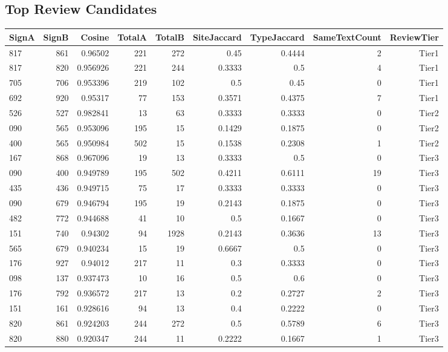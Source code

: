 ﻿\documentclass[11pt,a4paper]{article}
\begin{document}
\subsection*{Top Review Candidates}
\begin{center}
\begin{tabular}{lrrrrrrrr}
\toprule
\textbf{SignA} & \textbf{SignB} & \textbf{Cosine} & \textbf{TotalA} & \textbf{TotalB} & \textbf{SiteJaccard} & \textbf{TypeJaccard} & \textbf{SameTextCount} & \textbf{ReviewTier} \\
\midrule
817 & 861 & 0.96502 & 221 & 272 & 0.45 & 0.4444 & 2 & Tier1 \\
817 & 820 & 0.956926 & 221 & 244 & 0.3333 & 0.5 & 4 & Tier1 \\
705 & 706 & 0.953396 & 219 & 102 & 0.5 & 0.45 & 0 & Tier1 \\
692 & 920 & 0.95317 & 77 & 153 & 0.3571 & 0.4375 & 7 & Tier1 \\
526 & 527 & 0.982841 & 13 & 63 & 0.3333 & 0.3333 & 0 & Tier2 \\
090 & 565 & 0.953096 & 195 & 15 & 0.1429 & 0.1875 & 0 & Tier2 \\
400 & 565 & 0.950984 & 502 & 15 & 0.1538 & 0.2308 & 1 & Tier2 \\
167 & 868 & 0.967096 & 19 & 13 & 0.3333 & 0.5 & 0 & Tier3 \\
090 & 400 & 0.949789 & 195 & 502 & 0.4211 & 0.6111 & 19 & Tier3 \\
435 & 436 & 0.949715 & 75 & 17 & 0.3333 & 0.3333 & 0 & Tier3 \\
090 & 679 & 0.946794 & 195 & 19 & 0.2143 & 0.1875 & 0 & Tier3 \\
482 & 772 & 0.944688 & 41 & 10 & 0.5 & 0.1667 & 0 & Tier3 \\
151 & 740 & 0.94302 & 94 & 1928 & 0.2143 & 0.3636 & 13 & Tier3 \\
565 & 679 & 0.940234 & 15 & 19 & 0.6667 & 0.5 & 0 & Tier3 \\
176 & 927 & 0.94012 & 217 & 11 & 0.3 & 0.3333 & 0 & Tier3 \\
098 & 137 & 0.937473 & 10 & 16 & 0.5 & 0.6 & 0 & Tier3 \\
176 & 792 & 0.936572 & 217 & 13 & 0.2 & 0.2727 & 2 & Tier3 \\
151 & 161 & 0.928616 & 94 & 13 & 0.4 & 0.2222 & 0 & Tier3 \\
820 & 861 & 0.924203 & 244 & 272 & 0.5 & 0.5789 & 6 & Tier3 \\
820 & 880 & 0.920347 & 244 & 11 & 0.2222 & 0.1667 & 1 & Tier3 \\
\bottomrule
\end{tabular}
\end{center}
\end{document}
